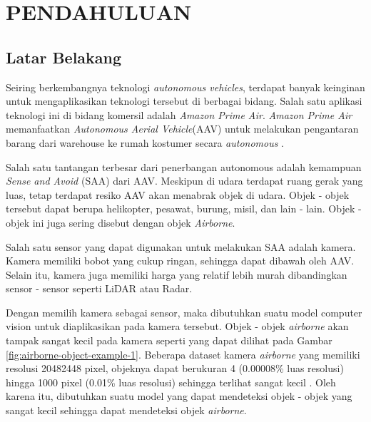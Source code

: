 \chapter{PENDAHULUAN}
\section{Latar Belakang}
    Seiring berkembangnya teknologi \emph{autonomous vehicles}, terdapat banyak keinginan untuk mengaplikasikan teknologi tersebut di berbagai bidang.
    Salah satu aplikasi teknologi ini di bidang komersil adalah \emph{Amazon Prime Air}.
    \emph{Amazon Prime Air} memanfaatkan \emph{Autonomous Aerial Vehicle}(AAV) untuk melakukan pengantaran barang dari warehouse ke rumah kostumer secara \emph{autonomous} \parencite{prime_air}.

    Salah satu tantangan terbesar dari penerbangan autonomous adalah kemampuan \emph{Sense and Avoid} (SAA) dari AAV.
    Meskipun di udara terdapat ruang gerak yang luas, tetap terdapat resiko AAV akan menabrak objek di udara.
    Objek - objek tersebut dapat berupa helikopter, pesawat, burung, misil, dan lain - lain.
    Objek - objek ini juga sering disebut dengan objek \emph{Airborne}\parencite{aot_docs}.

    Salah satu sensor yang dapat digunakan untuk melakukan SAA adalah kamera.
    Kamera memiliki bobot yang cukup ringan, sehingga dapat dibawah oleh AAV.
    Selain itu, kamera juga memiliki harga yang relatif lebih murah dibandingkan sensor - sensor seperti LiDAR atau Radar.
 
    Dengan memilih kamera sebagai sensor, maka dibutuhkan suatu model computer vision untuk diaplikasikan pada kamera tersebut.
    Objek - objek \emph{airborne} akan tampak sangat kecil pada kamera seperti yang dapat dilihat pada Gambar \ref{fig:airborne-object-example-1}.
    Beberapa dataset kamera \emph{airborne} yang memiliki resolusi 20482448 pixel, objeknya dapat berukuran 4 (0.00008\% luas resolusi) hingga 1000 pixel (0.01\% luas resolusi) sehingga terlihat sangat kecil \parencite{aot_dataset}.
    Oleh karena itu, dibutuhkan suatu model yang dapat mendeteksi objek - objek yang sangat kecil sehingga dapat mendeteksi objek \emph{airborne}.

